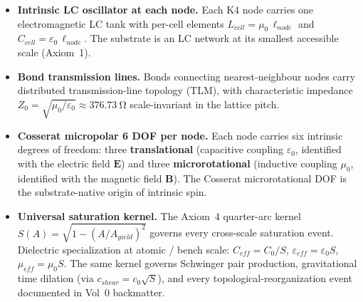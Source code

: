 \begin{itemize}
    \item \textbf{Intrinsic LC oscillator at each node.} Each K4 node carries one electromagnetic LC tank with per-cell elements $L_{cell} = \mu_0\, \ell_{node}$ and $C_{cell} = \varepsilon_0\, \ell_{node}$. The substrate is an LC network at its smallest accessible scale (Axiom~1).
    \item \textbf{Bond transmission lines.} Bonds connecting nearest-neighbour nodes carry distributed transmission-line topology (TLM), with characteristic impedance $Z_0 = \sqrt{\mu_0/\varepsilon_0} \approx \qty{376.73}{\ohm}$ scale-invariant in the lattice pitch.
    \item \textbf{Cosserat micropolar 6 DOF per node.} Each node carries six intrinsic degrees of freedom: three \textbf{translational} (capacitive coupling $\varepsilon_0$, identified with the electric field $\mathbf{E}$) and three \textbf{microrotational} (inductive coupling $\mu_0$, identified with the magnetic field $\mathbf{B}$). The Cosserat microrotational DOF is the substrate-native origin of intrinsic spin.
    \item \textbf{Universal saturation kernel.} The Axiom~4 quarter-arc kernel $S(A) = \sqrt{1 - (A/A_{yield})^2}$ governs every cross-scale saturation event. Dielectric specialization at atomic / bench scale: $C_{eff} = C_0/S$, $\varepsilon_{eff} = \varepsilon_0 S$, $\mu_{eff} = \mu_0 S$. The same kernel governs Schwinger pair production, gravitational time dilation (via $c_{shear} = c_0 \sqrt{S}$), and every topological-reorganization event documented in Vol~0 backmatter.

\end{itemize}
